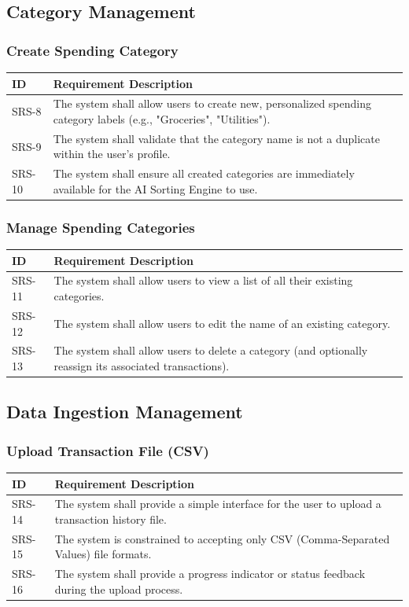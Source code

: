 \subsection{Category Management}

\subsubsection{Create Spending Category}
\begin{longtable}{|p{2.5cm}|p{12cm}|}
	\hline
	\textbf{ID} & \textbf{Requirement Description} \\
	\hline
	SRS-8 & The system shall allow users to create new, personalized spending category labels (e.g., "Groceries", "Utilities"). \\ \hline
	SRS-9 & The system shall validate that the category name is not a duplicate within the user's profile. \\ \hline
	SRS-10 & The system shall ensure all created categories are immediately available for the AI Sorting Engine to use. \\ \hline
\end{longtable}

\subsubsection{Manage Spending Categories}
\begin{longtable}{|p{2.5cm}|p{12cm}|}
	\hline
	\textbf{ID} & \textbf{Requirement Description} \\
	\hline
	SRS-11 & The system shall allow users to view a list of all their existing categories. \\ \hline
	SRS-12 & The system shall allow users to edit the name of an existing category. \\ \hline
	SRS-13 & The system shall allow users to delete a category (and optionally reassign its associated transactions). \\ \hline
\end{longtable}

\subsection{Data Ingestion Management}

\subsubsection{Upload Transaction File (CSV)}
\begin{longtable}{|p{2.5cm}|p{12cm}|}
	\hline
	\textbf{ID} & \textbf{Requirement Description} \\
	\hline
	SRS-14 & The system shall provide a simple interface for the user to upload a transaction history file. \\ \hline
	SRS-15 & The system is constrained to accepting only CSV (Comma-Separated Values) file formats. \\ \hline
	SRS-16 & The system shall provide a progress indicator or status feedback during the upload process. \\ \hline
\end{longtable}

